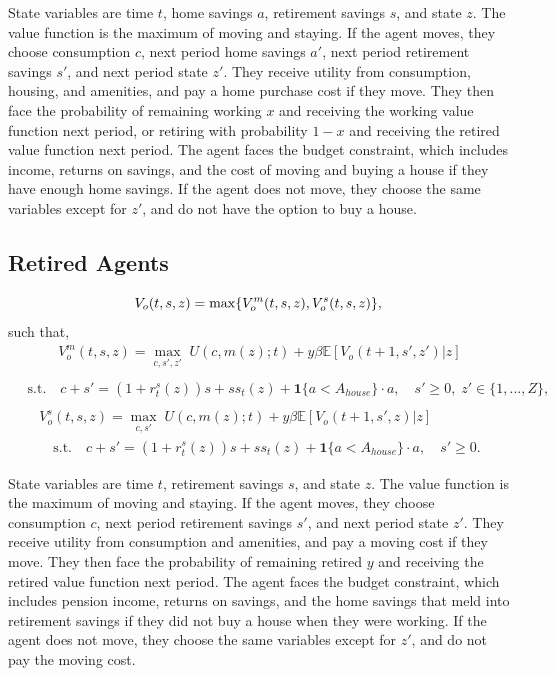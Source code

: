 \documentclass[12pt]{article}
\theoremstyle{remark}
\newcommand{\E}{\mathbb{E}}
\newcommand{\1}{\mathbf{1}}
\begin{document}
\begin{itemize}[leftmargin=1.2em]
\begin{enumerate}
State variables are time $t$, home savings $a$, retirement savings $s$, and state $z$. The value function is the maximum of moving and staying. If the agent moves, they choose consumption $c$,
next period home savings $a'$, next period retirement savings $s'$, and next period state $z'$. They receive utility from consumption, housing, and amenities, and pay a home purchase cost if they move. They then
face the probability of remaining working $x$ and receiving the working value function next period, or retiring with probability $1-x$ and receiving the retired value function next period. The agent faces the
budget constraint, which includes income, returns on savings, and the cost of moving and buying a house if they have enough home savings. If the agent does not move, they choose the same variables except for $z'$,
and do not have the option to buy a house.
 
\subsection{Retired Agents}
\begin{equation}
  V_o(t, s, z) = \max\{V_o^m(t, s, z), V_o^s(t, s, z)\}, \\
\end{equation}
such that,
\begin{gather*}
  V^m_o(t, s, z) = \max_{c, s', z'} \; U(c, m(z); t) + y\beta \E[V_o(t+1, s', z')|z] \\
\end{gather*}
\begin{gather*}
  \quad \text{s.t.} \quad c + s' = (1+r^s_t(z))s + ss_t(z) + \1\{a < A_{house}\} \cdot a,
  \quad s' \geq 0, \; z' \in \{1, ..., Z\}, \\
\end{gather*}
\begin{gather*}
  V^s_o(t, s, z) = \max_{c, s'} \; U(c, m(z); t) + y\beta \E[V_o(t+1, s', z)|z] \\
  \quad \text{s.t.} \quad c + s' = (1+r^s_t(z))s + ss_t(z) + \1\{a < A_{house}\} \cdot a,
  \quad s' \geq 0.
\end{gather*}

State variables are time $t$, retirement savings $s$, and state $z$. The value function is the maximum of moving and staying. If the agent moves, they choose consumption $c$,
next period retirement savings $s'$, and next period state $z'$. They receive utility from consumption and amenities, and pay a moving cost if they move. They then
face the probability of remaining retired $y$ and receiving the retired value function next period. The agent faces the budget constraint, which includes pension income, 
returns on savings, and the home savings that meld into retirement savings if they did not buy a house when they were working. If the agent does not move, they choose 
the same variables except for $z'$, and do not pay the moving cost.



\end{enumerate}
\end{itemize}
\end{document}
